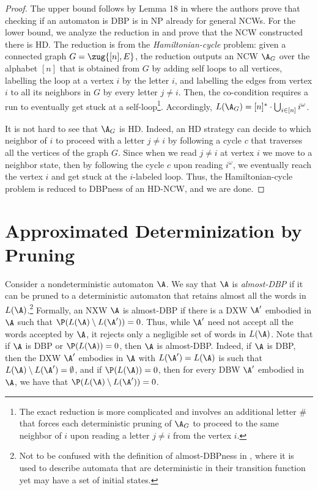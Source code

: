 \documentclass{lmcs}
\begin{document}
\begin{proof}
The upper bound follows by Lemma 18 in \cite{KM18} where the authors prove that checking if an automaton is DBP is in NP already for general NCWs.
For the lower bound, we analyze the reduction in \cite{KM18} and prove that the NCW constructed there is HD.
The reduction is from the \emph{Hamiltonian-cycle} problem: 
given a connected graph $G = \zug{[n], E}$, the reduction outputs an NCW $\A_G$ over the alphabet $[n]$
that is obtained from $G$ by adding self loops to all vertices, labelling the loop at a vertex $i$ by the letter $i$, and labelling the edges from vertex $i$ to all its neighbors in $G$ by every letter $j\neq i$. Then, the co-\buchi condition requires a run to eventually get stuck at a self-loop\footnote{The exact reduction is more complicated and involves an additional letter $\#$ that forces each deterministic pruning of $\A_G$ to proceed to the same neighbor of $i$ upon reading a letter $j\neq i$ from the vertex $i$.}. Accordingly, $L(\A_G) = [n]^*\cdot \bigcup_{i\in [n]} i^\omega$.

It is not hard to see that $\A_G$ is HD. Indeed, an HD strategy can decide to which neighbor of $i$ to proceed with a letter $j \neq i$ by following a cycle $c$ that traverses all the vertices of the graph $G$. Since when we read $j \neq i$ at vertex $i$ we move to a neighbor state, then by following the cycle $c$ upon reading $i^\omega$, we eventually reach the vertex $i$ and get stuck at the $i$-labeled loop. Thus, the Hamiltonian-cycle problem is reduced to DBPness of an HD-NCW, and we are done.
\end{proof}



\section{Approximated Determinization by Pruning}
\label{sec prob}

Consider a nondeterministic automaton $\A$. 
We say that $\A$ is {\em almost-DBP\/} if it can be pruned to a deterministic automaton that retains almost all the words in $L(\A)$.\footnote{Not to be confused with the definition of almost-DBPness in \cite{AKL10}, where it is used to describe automata that are deterministic in their transition function yet may have a set of initial states.}
Formally, an NXW $\A$ is almost-DBP if there is a DXW $\A'$ embodied in $\A$ such that $\P(L(\A)\setminus L(\A'))=0$. 
Thus, while $\A'$ need not accept all the words accepted by $\A$, it rejects only a negligible set of words in $L(\A)$. 
Note that if $\A$ is DBP or $\P(L(\A))=0$, then $\A$ is almost-DBP. Indeed, if $\A$ is DBP, then the DXW $\A'$ embodies in $\A$ with $L(\A')=L(\A)$ is such that $L(\A)\setminus L(\A')=\emptyset$, and if $\P(L(\A))=0$, then for every DBW $\A'$ embodied in $\A$, we have that $\P(L(\A)\setminus L(\A'))=0$. 
\end{document}
